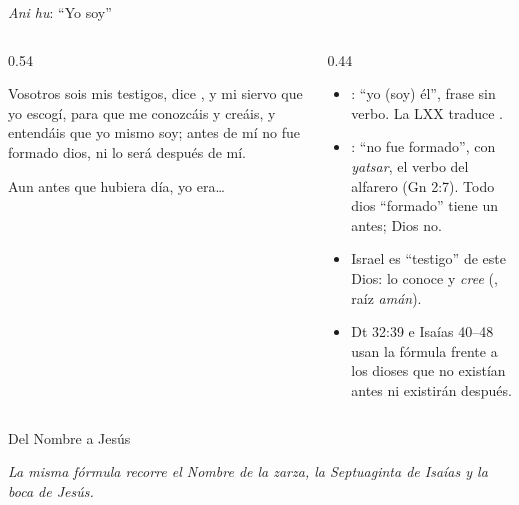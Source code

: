 \begin{frame}{\emph{Ani hu}: ``Yo soy''}
\begin{columns}[t,onlytextwidth]
\begin{column}{0.54\textwidth}
\begin{center}\end{center}
\begin{cita}Vosotros sois mis testigos, dice \SENOR, y mi siervo que yo escogí, para que me conozcáis y creáis, y entendáis que yo mismo soy; antes de mí no fue formado dios, ni lo será después de mí.\end{cita}
\begin{cita}Aun antes que hubiera día, yo era\ldots{}\end{cita}
\end{column}
\begin{column}{0.44\textwidth}\scriptsize
\begin{itemize}
\item {}: ``yo (soy) él'', frase sin verbo. La LXX traduce .
\item {}: ``no fue formado'', con \emph{yatsar}, el verbo del alfarero (Gn 2:7). Todo dios ``formado'' tiene un antes; Dios no.
\item Israel es ``testigo'' de este Dios: lo conoce y \emph{cree} (, raíz \emph{amán}).
\item Dt 32:39 e Isaías 40--48 usan la fórmula frente a los dioses que no existían antes ni existirán después.
\end{itemize}
\end{column}
\end{columns}
\end{frame}

\begin{frame}{Del Nombre a Jesús}
\centering
{}\par\medskip
{\scriptsize\itshape\color{gris} La misma fórmula recorre el Nombre de la zarza, la Septuaginta de Isaías y la boca de Jesús.}
\end{frame}

